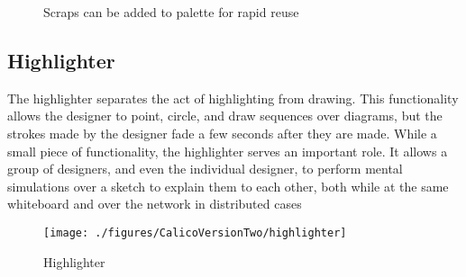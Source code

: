 \begin{figure}
  \centering
   \caption {Scraps can be added to palette for rapid reuse}
   \label{fig:calico-version-two:palette}
\end{figure}

\subsection{Highlighter}

The highlighter separates the act of highlighting from drawing. This functionality allows the designer to point, circle, and draw sequences over diagrams, but the strokes made by the designer fade a few seconds after they are made. While a small piece of functionality, the highlighter serves an important role. It allows a group of designers, and even the individual designer, to perform mental simulations over a sketch to explain them to each other, both while at the same whiteboard and over the network in distributed cases

\begin{figure*}[tbh]
  \centering
  \texttt{[image: ./figures/CalicoVersionTwo/highlighter]}
  \caption{Highlighter}
  \label{figure:calico-version-two:highlighter}
\end{figure*}

